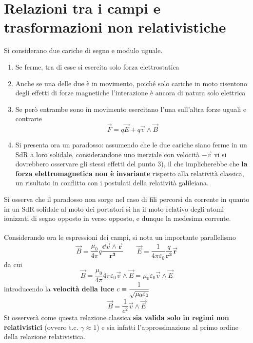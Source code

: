 \section{Relazioni tra i campi e trasformazioni non relativistiche}
Si considerano due cariche di segno e modulo uguale.
\begin{enumerate}
\item Se ferme, tra di esse si esercita solo forza elettrostatica
\item Anche se una delle due è in movimento, poiché solo cariche in moto risentono degli effetti di forze magnetiche l'interazione è ancora di natura solo elettrica
\item Se però entrambe sono in movimento esercitano l'una sull'altra forze uguali e contrarie
\[\vec{F} = q \vec{E} + q \vec{v} \wedge \vec{B}\]
\item Si presenta ora un paradosso: assumendo che le due cariche siano ferme in un SdR a loro solidale, considerandone uno inerziale con velocità $-\vec{v}$ vi si dovrebbero osservare gli stessi effetti del punto 3), il che implicherebbe che \textbf{la forza elettromagnetica non è invariante} rispetto alla relatività classica, un risultato in conflitto con i postulati della relatività galileiana.
\end{enumerate}
Si osserva che il paradosso non sorge nel caso di fili percorsi da corrente in quanto in un SdR solidale al moto dei portatori si ha il moto relativo degli atomi ionizzati di segno opposto in verso opposto, e dunque la medesima corrente.
\\~\\
Considerando ora le espressioni dei campi, si nota un importante parallelismo
\[\vec{B} = \frac{\mu_0}{4 \pi} q \frac{\dd{\vec{v}} \wedge \mathbf{\vec{r}}}{\mathbf{r^3}} \qquad \vec{E} = \frac{1}{4 \pi \varepsilon_0} \frac{q}{\mathbf{r^3}} \mathbf{\vec{r}}\]
da cui
\[\vec{B} = \frac{\mu_0}{4 \pi} 4 \pi \varepsilon_0 \vec{v} \wedge \vec{E} = \mu_0 \varepsilon_0 \vec{v} \wedge \vec{E}\]
introducendo la \textbf{velocità della luce} $\displaystyle c \equiv \frac{1}{\sqrt{\mu_0 \varepsilon_0}}$
\[\vec{B} = \frac{1}{c^2} \vec{v} \wedge \vec{E}\]
Si osserverà come questa relazione classica \textbf{sia valida solo in regimi non relativistici} (ovvero t.c. $\gamma \approx 1$) e sia infatti l'approssimazione al primo ordine della relazione relativistica.

